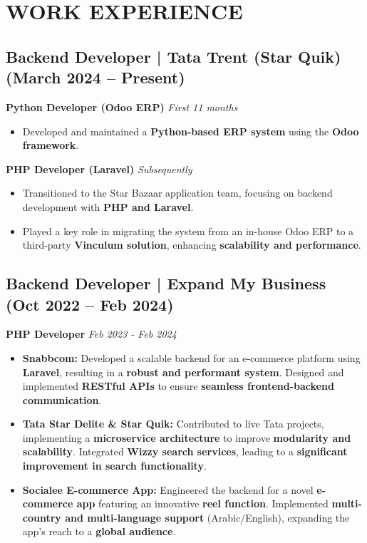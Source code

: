 \documentclass[10pt,a4paper]{article}
\begin{document}
\section*{WORK EXPERIENCE}

\subsection*{Backend Developer | Tata Trent (Star Quik) (March 2024 – Present)}

\textbf{Python Developer (Odoo ERP)} \hfill \textit{First 11 months}
\begin{itemize}[leftmargin=*, itemsep=0pt, topsep=2pt, parsep=0pt]
    \item Developed and maintained a \textbf{Python-based ERP system} using the \textbf{Odoo framework}.
\end{itemize}

\vspace{1mm}
\textbf{PHP Developer (Laravel)} \hfill \textit{Subsequently}
\begin{itemize}[leftmargin=*, itemsep=0pt, topsep=2pt, parsep=0pt]
    \item Transitioned to the Star Bazaar application team, focusing on backend development with \textbf{PHP and Laravel}.
    \item Played a key role in migrating the system from an in-house Odoo ERP to a third-party \textbf{Vinculum solution}, enhancing \textbf{scalability and performance}.
\end{itemize}
\vspace{2mm}

\subsection*{Backend Developer | Expand My Business (Oct 2022 – Feb 2024)}

\textbf{PHP Developer} \hfill \textit{Feb 2023 - Feb 2024}
\begin{itemize}[leftmargin=*, itemsep=0pt, topsep=2pt, parsep=0pt]
    \item \textbf{Snabbcom:} Developed a scalable backend for an e-commerce platform using \textbf{Laravel}, resulting in a \textbf{robust and performant system}. Designed and implemented \textbf{RESTful APIs} to ensure \textbf{seamless frontend-backend communication}.
    \item \textbf{Tata Star Delite \& Star Quik:} Contributed to live Tata projects, implementing a \textbf{microservice architecture} to improve \textbf{modularity and scalability}. Integrated \textbf{Wizzy search services}, leading to a \textbf{significant improvement in search functionality}.
    \item \textbf{Socialee E-commerce App:} Engineered the backend for a novel \textbf{e-commerce app} featuring an innovative \textbf{reel function}. Implemented \textbf{multi-country and multi-language support} (Arabic/English), expanding the app's reach to a \textbf{global audience}.
\end{itemize}
\end{document}
